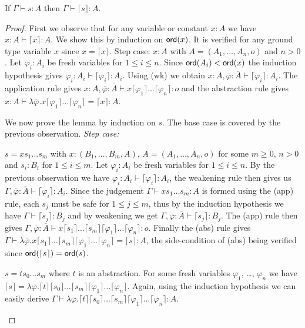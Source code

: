 \documentclass{llncs}
\newcommand{\elnf}[1]{\lceil #1\rceil} %
\newcommand\ord[1]{{\sf
    ord}(#1)} \newcommand\typear{\rightarrow}
\begin{document}
\begin{lemma}
\label{lem:elnf_preserves_safety}
If $\Gamma \vdash s :A$ then $\Gamma \vdash \elnf{s} :A$.
\end{lemma}
\begin{proof}

 First we observe that for any variable or constant $x:A$ we have $x:A \vdash \elnf{x} :A$. We show this by induction on $\ord{x}$. 
It is verified for any ground type variable $x$ 
since $x = \elnf{x}$. 
Step case: $x:A$ with $A=(A_1, \ldots, A_n,o)$ and $n>0$. Let $\varphi_i:A_i$ be fresh variables for $1\leq i\leq n$. 
Since $\ord{A_i} < \ord{x}$ the induction hypothesis gives $\varphi_i :A_i \vdash \elnf{\varphi_i} : A_i$. Using {\sf(wk)} we obtain $x:A, \overline{\varphi} : \overline{A}
  \vdash \elnf{\varphi_i} :A_i$.  The application rule gives $x :A, \overline{\varphi} : \overline{A} \vdash x \elnf{\varphi_1} \ldots \elnf{\varphi_n}
  : o$ and the abstraction rule gives $ x :A \vdash \lambda
  \overline{\varphi} . x \elnf{\varphi_1} \ldots \elnf{\varphi_n} =
  \elnf{x} :A$.


We now prove the lemma by induction on $s$.
The base case is covered by the previous observation.
\emph{Step case:}
\begin{compactitem}
\item $s = x s_1 \ldots s_m$ with $x: (B_1, \ldots, B_m, A)$, $A = (A_1, \ldots, A_n, o)$ for some $m\geq 0$, $n>0$ and $s_i : B_i$ for $1 \leq i \leq
  m$.  Let $\varphi_i: A_i$ be fresh variables for $1\leq i \leq
  n$. By the previous observation we have $\varphi_i :A_i \vdash \elnf{\varphi_i} :A_i$, the weakening rule then gives us $\Gamma , \overline{\varphi} : \overline{A}
  \vdash \elnf{\varphi_i} : A_i$.  Since the judgement
  $\Gamma \vdash x s_1 \ldots s_m : A$ is formed using the {\sf (app)} rule, each $s_j$ must be safe for $1\leq j \leq m$, thus by the induction hypothesis we have $\Gamma \vdash \elnf{s_j} : B_j$ and by weakening we get $\Gamma, \overline{\varphi} :\overline{A} \vdash \elnf{s_j} : B_j$.  The {\sf(app)}
  rule then gives $\Gamma, \overline{\varphi} :\overline{A} \vdash x \elnf{s_1} \ldots \elnf{s_m} \elnf{\varphi_1} \ldots \elnf{\varphi_n} : o$. Finally
  the {\sf (abs)} rule gives $\Gamma \vdash \lambda \overline{\varphi} . x
  \elnf{s_1} \ldots \elnf{s_m} \elnf{\varphi_1} \ldots
  \elnf{\varphi_n} = \elnf{s} : A$, the side-condition of {\sf (abs)} being verified since $\ord{\elnf{s}} = \ord{s}$.


\item $s = t s_0 \ldots s_m$ where $t$ is an abstraction. 
For some fresh variables $\varphi_1$, \ldots, $\varphi_n$
we have $\elnf{s} = \lambda \overline{\varphi}. \elnf{t} \elnf{s_0} \ldots \elnf{s_m} \elnf{\varphi_1}
  \ldots \elnf{\varphi_n}$. Again, using the induction hypothesis we can easily derive $\Gamma \vdash
 \lambda \overline{\varphi}. \elnf{t} \elnf{s_0} \ldots \elnf{s_m} \elnf{\varphi_1} \ldots \elnf{\varphi_n} : A$.


\end{compactitem}
\end{proof}
\end{document}
